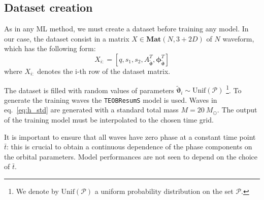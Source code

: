 \subsection{Dataset creation}
As in any ML method, we must create a dataset before training any model.
In our case, the dataset consist in a matrix ${X \in \mathbf{Mat}(N,3+2D)}$ of $N$ waveform, which has the following form:
\begin{equation} \label{eq:dataset}
	X_{i:} = [q,s_1,s_2, {A}_{{\tilde{\boldsymbol{\vartheta}}}}^T, \boldsymbol{\phi}_{{\tilde{\boldsymbol{\vartheta}}}}^T]
\end{equation}
where $X_{i:}$ denotes the i-th row of the dataset matrix.
\par
The dataset is filled with random values of parameters ${\tilde{\boldsymbol{\vartheta}}}_i \sim \textrm{Unif}(\mathcal{P})$
\footnote{We denote by $\textrm{Unif}(\mathcal{P})$ a uniform probability distribution on the set $\mathcal{P}$.}.
To generate the training waves the \texttt{TEOBResumS} model is used.
Waves in eq.~\eqref{eq:h_std} are generated with a standard total mass
$M = \SI{20}{M_\odot}$.
The output of the training model must be interpolated to the chosen time grid.
\par
It is important to ensure that all waves have zero phase at a constant
time point $\bar{t}$: this is crucial to obtain a continuous
dependence of the phase components on the orbital parameters. Model
performances are not seen to depend on the choice of
$\bar{t}$.


